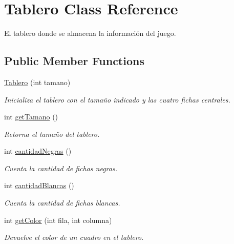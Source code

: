\hypertarget{class_tablero}{}\section{Tablero Class Reference}
\label{class_tablero}


El tablero donde se almacena la información del juego.  


\subsection*{Public Member Functions}
\begin{DoxyCompactItemize}
\item 
\mbox{\hyperlink{class_tablero_ac92adc2bd5f2ed16d8ee121523956c49}{Tablero}} (int tamano)
\begin{DoxyCompactList}\small\item\em Inicializa el tablero con el tamaño indicado y las cuatro fichas centrales. \end{DoxyCompactList}\item 
\mbox{\label{class_tablero_af506d72b2430b8e1068ac16e50a324a6}} 
int \mbox{\hyperlink{class_tablero_af506d72b2430b8e1068ac16e50a324a6}{get\+Tamano}} ()
\begin{DoxyCompactList}\small\item\em Retorna el tamaño del tablero. \end{DoxyCompactList}\item 
int \mbox{\hyperlink{class_tablero_af35697b272eb9fa8478867da8ce49caf}{cantidad\+Negras}} ()
\begin{DoxyCompactList}\small\item\em Cuenta la cantidad de fichas negras. \end{DoxyCompactList}\item 
int \mbox{\hyperlink{class_tablero_a8467113a62a739be46f6a17ce876e97e}{cantidad\+Blancas}} ()
\begin{DoxyCompactList}\small\item\em Cuenta la cantidad de fichas blancas. \end{DoxyCompactList}\item 
int \mbox{\hyperlink{class_tablero_a885e7de2aeb202acd70c1ac8896ad1c1}{get\+Color}} (int fila, int columna)
\begin{DoxyCompactList}\small\item\em Devuelve el color de un cuadro en el tablero. \end{DoxyCompactList}\item 

\end{DoxyCompactItemize}
